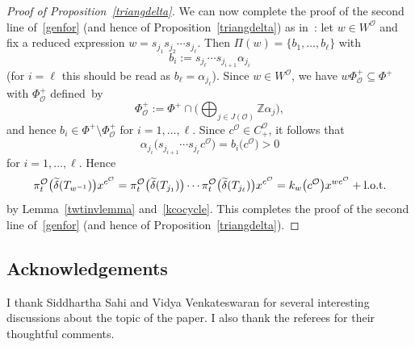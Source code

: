 \documentclass[pdftex]{sigma}
\numberwithin{equation}{section}
\begin{document}
\begin{proof}[Proof of Proposition~\ref{triangdelta}]
We can now complete the proof of the second line of~\eqref{genfor} (and hence of Proposition~\ref{triangdelta}) as in~\cite[Proposition~5.29]{SSV2}:
let $w\in W^\mathcal{O}$ and fix a reduced expression $w=s_{j_1}s_{j_2}\cdots s_{j_\ell}$. Then $\Pi(w)=\{b_1,\dots,b_\ell\}$ with
\[
b_i:=s_{j_\ell}\cdots s_{j_{i+1}}\alpha_{j_i}
\]
(for $i=\ell$ this should be read as $b_\ell=\alpha_{j_\ell}$). Since $w\in W^\mathcal{O}$, we have $w\Phi_\mathcal{O}^+\subseteq\Phi^+$ with $\Phi_{\mathcal{O}}^+$
defined~by
\[
\Phi_\mathcal{O}^+:=
\Phi^+\cap\biggl(\bigoplus_{j\in J(\mathcal{O})}\mathbb{Z}\alpha_j\biggr),
\]
and hence $b_i\in\Phi^+\setminus\Phi_\mathcal{O}^+$ for $i=1,\dots,\ell$. Since $c^\mathcal{O}\in C_+^\mathcal{O}$, it follows that
\[
\alpha_{j_i}\bigl(s_{j_{i+1}}\cdots s_{j_\ell}c^\mathcal{O}\bigr)=b_i\bigl(c^\mathcal{O}\bigr)>0
\]
for $i=1,\dots,\ell$.
Hence
\[
\pi_{t}^\mathcal{O}\bigl(\widetilde{\delta}(T_{w^{-1}})\bigr)x^{c^\mathcal{O}} =\pi_{t}^\mathcal{O}\bigl(\widetilde{\delta}(T_{j_1})\bigr)\cdots\pi_{t}^\mathcal{O}\bigl(\widetilde{\delta}(T_{j_\ell})\bigr)x^{c^\mathcal{O}}=
k_w\bigl(c^\mathcal{O}\bigr)x^{wc^\mathcal{O}}+ {\rm l.o.t.}
\]
by Lemma~\ref{twtinvlemma} and~\eqref{kcocycle}. This completes the proof of the second line of~\eqref{genfor} (and hence of Proposition~\ref{triangdelta}).
\end{proof}

\subsection*{Acknowledgements}
I thank Siddhartha Sahi and Vidya Venkateswaran for several interesting discussions about the topic of the paper. I also thank the referees for their thoughtful comments.
\end{document}
